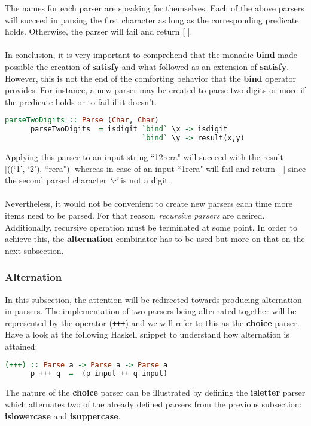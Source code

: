 \documentclass[a4paper, onecolumn]{article}
\begin{document}
    \noindent The names for each parser are speaking for themselves. Each of the above parsers will succeed in parsing the first character as long as the corresponding predicate holds. Otherwise, the parser will fail and return [ ]. \\ \\ 
    In conclusion, it is very important to comprehend that the monadic \textbf{bind} made possible the creation of \textbf{satisfy} and what followed as an extension of \textbf{satisfy}. However, this is not the end of the comforting behavior that the \textbf{bind} operator provides. For instance, a new parser may be created to parse two digits or more if the predicate holds or to fail if it doesn't. 
    
    \begin{tcolorbox}
    \begin{lstlisting}[language=Haskell]
      parseTwoDigits :: Parse (Char, Char)
      parseTwoDigits  = isdigit `bind` \x -> isdigit 
                                `bind` \y -> result(x,y)
    \end{lstlisting}
    \end{tcolorbox}
    
    \noindent Applying this parser to an input string ``12rera" will succeed with the result [((`1', `2'), ``rera")] whereas in case of an input ``1rera" will fail and return [ ] since the second parsed character \textit{`r'} is not a digit. \\ \\
    Nevertheless, it would not be convenient to create new parsers each time more items need to be parsed. For that reason, \textit{recursive parsers} are desired. Additionally, recursive operation must be terminated at some point. In order to achieve this, the \textbf{alternation} combinator has to be used but more on that on the next subsection.
    \subsubsection{Alternation}
    
    In this subsection, the attention will be redirected towards producing alternation in parsers. The implementation of two parsers being alternated together will be represented by the operator (\texttt{+++}) and we will refer to this as the \textbf{choice} parser. Have a look at the following Haskell snippet to understand how alternation is attained:
    
    \begin{tcolorbox}
    \begin{lstlisting}[language=Haskell]
      (+++) :: Parse a -> Parse a -> Parse a
      p +++ q  =  (p input ++ q input)
    \end{lstlisting}
    \end{tcolorbox}
    \noindent The nature of the \textbf{choice} parser can be illustrated by defining the \textbf{isletter} parser which alternates two of the already defined parsers from the previous subsection: \textbf{islowercase} and \textbf{isuppercase}.
    
\end{document}
